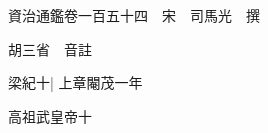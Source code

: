 






























































資治通鑑卷一百五十四　宋　司馬光　撰

胡三省　音註

梁紀十|{
	上章閹茂一年}


高祖武皇帝十

